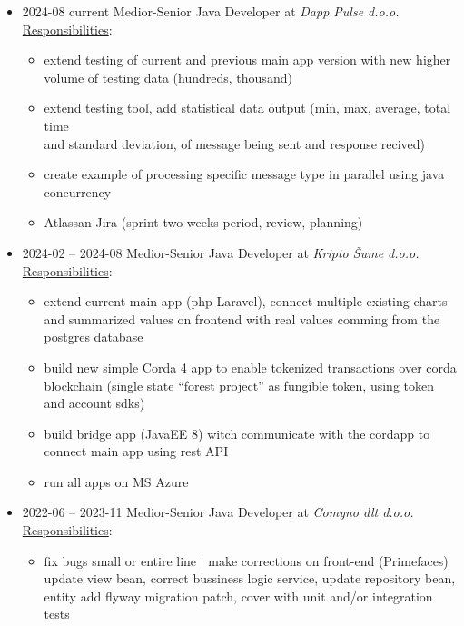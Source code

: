 \documentclass[12pt]{article}
\begin{document}
\begin{itemize}
    \setlength\itemsep{0em}
    \item 2024-08 current Medior-Senior Java Developer at \textit{Dapp Pulse d.o.o.} \\
        \underline{Responsibilities}:
        \begin{itemize}
            \setlength\itemsep{0em}
            \item extend testing of current and previous main app version with new higher volume of testing data (hundreds, thousand)
            \item extend testing tool, add statistical data output (min, max, average, total time \\ and standard deviation, of message being sent and response recived)
            \item create example of processing specific message type in parallel using java concurrency
            \item Atlassan Jira (sprint two weeks period, review, planning)
        \end{itemize}
    \item 2024-02 -- 2024-08 Medior-Senior Java Developer at \textit{Kripto Šume d.o.o.} \\
        \underline{Responsibilities}:
        \begin{itemize}
            \setlength\itemsep{0em}
            \item extend current main app (php Laravel), connect multiple existing charts and summarized values on frontend with real values comming from the postgres database
            \item build new simple Corda 4 app to enable tokenized transactions over corda blockchain (single state “forest project” as fungible token, using token and account sdks)
            \item build bridge app (JavaEE 8) witch communicate with the cordapp to connect main app using rest API
            \item run all apps on MS Azure
        \end{itemize}
    \item 2022-06 -- 2023-11 Medior-Senior Java Developer at \textit{Comyno dlt d.o.o.} \\
        \underline{Responsibilities}:
        \begin{itemize}
            \setlength\itemsep{0em}
            \item fix bugs small or entire line | make corrections on front-end (Primefaces) update view bean, correct bussiness logic service, update repository bean, entity add flyway migration patch, cover with unit and/or integration tests 

\end{itemize}
\end{itemize}
\end{document}
